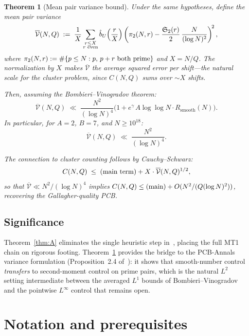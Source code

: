 \documentclass[11pt,reqno]{amsart}
\theoremstyle{plain}
\newtheorem{theorem}{Theorem}[section]
\theoremstyle{definition}
\theoremstyle{remark}
\newcommand{\Rsmooth}{R_{\mathrm{smooth}}}
\newcommand{\Sfrak}{\mathfrak{S}_2}
\begin{document}
\begin{theorem}[Mean pair variance bound]\label{thm:B}
Under the same hypotheses, define the \emph{mean pair variance}
\begin{equation}\label{eq:pair_var}
  \overline{\mathcal{V}}(N,Q) \;:=\;
  \frac{1}{X}\sum_{\substack{r \le X \\ r \textup{ even}}}
  \hat{b}_U\!\left(\frac{r}{X}\right)
  \left(\pi_2(N,r) - \frac{\Sfrak(r)}{2}\,
  \frac{N}{(\log N)^2}\right)^{\!2},
\end{equation}
where $\pi_2(N,r) := \#\{p \le N : p,\, p+r \textup{ both prime}\}$
and $X = N/Q$.
The normalization by $X$ makes $\overline{\mathcal{V}}$ the
\emph{average squared error per shift}---the natural scale for the
cluster problem, since $C(N,Q)$ sums over $\sim X$ shifts.

Then, assuming the Bombieri--Vinogradov theorem:
\[
  \overline{\mathcal{V}}(N,Q) \;\ll\;
  \frac{N^2}{(\log N)^4}
  \bigl(1 + e^{\gamma}\, A\log\log N \cdot \Rsmooth(N)\bigr).
\]
In particular, for $A = 2$, $B = 7$, and $N \ge 10^{18}$:
\[
  \overline{\mathcal{V}}(N,Q) \;\ll\; \frac{N^2}{(\log N)^4}.
\]

\medskip\noindent
The connection to cluster counting follows by Cauchy--Schwarz:
\begin{equation}\label{eq:CS_transfer}
  C(N,Q) \;\le\; \textup{(main term)}
  + X \cdot \overline{\mathcal{V}}(N,Q)^{1/2},
\end{equation}
so that $\overline{\mathcal{V}} \ll N^2/(\log N)^4$ implies
$C(N,Q) \le \textup{(main)} + O(N^2/(Q(\log N)^2))$,
recovering the Gallagher-quality PCB.
\end{theorem}

\subsection{Significance}

Theorem~\ref{thm:A} eliminates the single heuristic step in~\cite{MT1},
placing the full MT1 chain on rigorous footing. Theorem~\ref{thm:B}
provides the bridge to the PCB-Annals variance formulation
(Proposition~2.4 of~\cite{G37}): it shows that smooth-number control
\emph{transfers} to second-moment control on prime pairs, which is
the natural $L^2$ setting intermediate between the averaged $L^1$
bounds of Bombieri--Vinogradov and the pointwise $L^{\infty}$ control
that remains open.

\section{Notation and prerequisites}\label{sec:prereq}
\end{document}
